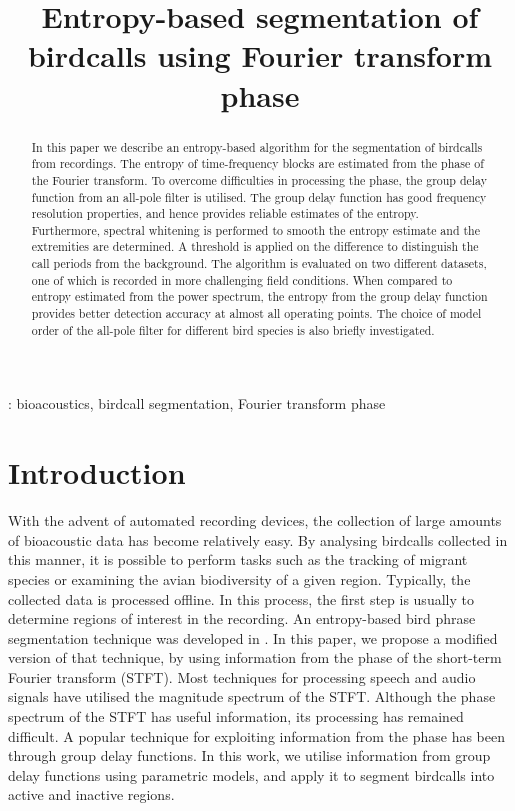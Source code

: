 \documentclass[a4paper]{article}
\title{Entropy-based segmentation of birdcalls using Fourier transform phase}
\begin{document}
  \maketitle
  \begin{abstract}
  In this  paper we describe an entropy-based algorithm for the segmentation of
  birdcalls from recordings. The entropy of time-frequency blocks are estimated
  from the phase of the Fourier transform. To overcome difficulties in
  processing the phase, the group delay function from an all-pole filter is
  utilised. The group delay function has good frequency resolution properties,
  and hence provides reliable estimates of the entropy. Furthermore, spectral
  whitening is performed to smooth the entropy estimate and the extremities are
  determined. A threshold is applied on the difference to distinguish the call
  periods from the background.  The algorithm is evaluated on two different
  datasets, one of which is recorded in more challenging field conditions. When
  compared to entropy estimated from the power spectrum, the entropy from the
  group delay function provides better detection accuracy at almost all
  operating points. The choice of model order of the all-pole filter for
  different bird species is also briefly investigated.
  \end{abstract}
  : bioacoustics, birdcall segmentation, Fourier transform phase
  



\section{Introduction}

With the advent of automated recording devices, the collection of large amounts of
bioacoustic data has become relatively easy. By analysing birdcalls collected in
this manner, it is possible to perform tasks such as the tracking of migrant
species or examining the avian biodiversity of a given region. Typically, the
collected data is processed offline. In this process, the first step is usually to
determine regions of interest in the recording. An entropy-based bird phrase segmentation
technique was developed in \cite{wang2013}. In this paper, we propose a modified
version of that technique, by using information from the phase of the short-term
Fourier transform (STFT). Most techniques for processing speech and audio signals have
utilised the magnitude spectrum of the STFT. Although the phase spectrum of the STFT has 
useful information, its processing has remained difficult. A popular technique
for exploiting information from the phase has been through group delay functions. In
this work, we utilise information from group delay functions using parametric
models, and apply it to segment birdcalls into active and inactive regions.
\end{document}
